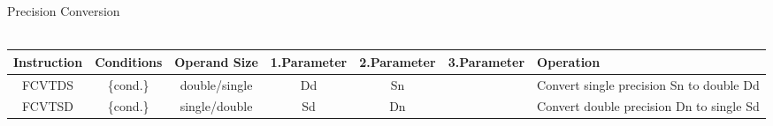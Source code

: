 \begin{landscape}
{\rot Precision Conversion}\\
\\
\begin{tabular}{|c|c|c|c|c|c|l|}
\hline
Instruction & Conditions & Operand Size & 1.Parameter & 2.Parameter & 3.Parameter & Operation\\
\hline
FCVTDS & \{cond.\} & double/single & Dd & Sn &  & Convert single precision Sn to double Dd\\
\hline
FCVTSD & \{cond.\} & single/double & Sd & Dn &  & Convert double precision Dn to single Sd\\
\hline
\end{tabular}\\
\\

\newpage

\end{landscape}
